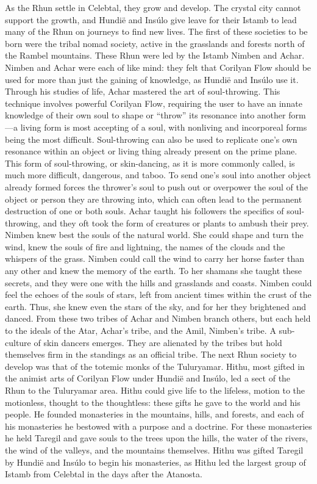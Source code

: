 \documentclass[smalldemyvopaper,11pt,twoside,onecolumn,openright,extrafontsizes]{memoir}
\begin{document}
{{	As the Rhun settle in Celebtal, they grow and develop. The crystal city cannot support the growth, and Hundië and Insúlo give leave for their Istamb to lead many of the Rhun on journeys to find new lives. The first of these societies to be born were the tribal nomad society, active in the grasslands and forests north of the Rambel mountains.
These Rhun were led by the Istamb Nimben and Achar. Nimben and Achar were each of like mind: they felt that Corilyan Flow should be used for more than just the gaining of knowledge, as Hundië and Insúlo use it. Through his studies of life, Achar mastered the art of soul-throwing. This technique involves powerful Corilyan Flow, requiring the user to have an innate knowledge of their own soul to shape or “throw” its resonance into another form—a living form is most accepting of a soul, with nonliving and incorporeal forms being the most difficult. Soul-throwing can also be used to replicate one’s own resonance within an object or living thing already present on the prime plane. This form of soul-throwing, or skin-dancing, as it is more commonly called, is much more difficult, dangerous, and taboo. To send one’s soul into another object already formed forces the thrower’s soul to push out or overpower the soul of the object or person they are throwing into, which can often lead to the permanent destruction of one or both souls. Achar taught his followers the specifics of soul-throwing, and they oft took the form of creatures or plants to ambush their prey. Nimben knew best the souls of the natural world. She could shape and turn the wind, knew the souls of fire and lightning, the names of the clouds and the whispers of the grass. Nimben could call the wind to carry her horse faster than any other and knew the memory of the earth. To her shamans she taught these secrets, and they were one with the hills and grasslands and coasts. Nimben could feel the echoes of the souls of stars, left from ancient times within the crust of the earth. Thus, she knew even the stars of the sky, and for her they brightened and danced.
From these two tribes of Achar and Nimben branch others, but each held to the ideals of the Atar, Achar’s tribe, and the Amil, Nimben’s tribe. A sub-culture of skin dancers emerges. They are alienated by the tribes but hold themselves firm in the standings as an official tribe.
The next Rhun society to develop was that of the totemic monks of the Tuluryamar. Hithu, most gifted in the animist arts of Corilyan Flow under Hundië and Insúlo, led a sect of the Rhun to the Tuluryamar area. Hithu could give life to the lifeless, motion to the motionless, thought to the thoughtless: these gifts he gave to the world and his people. He founded monasteries in the mountains, hills, and forests, and each of his monasteries he bestowed with a purpose and a doctrine. For these monasteries he held Taregil and gave souls to the trees upon the hills, the water of the rivers, the wind of the valleys, and the mountains themselves. Hithu was gifted Taregil by Hundië and Insúlo to begin his monasteries, as Hithu led the largest group of Istamb from Celebtal in the days after the Atanosta.
}}
\end{document}
